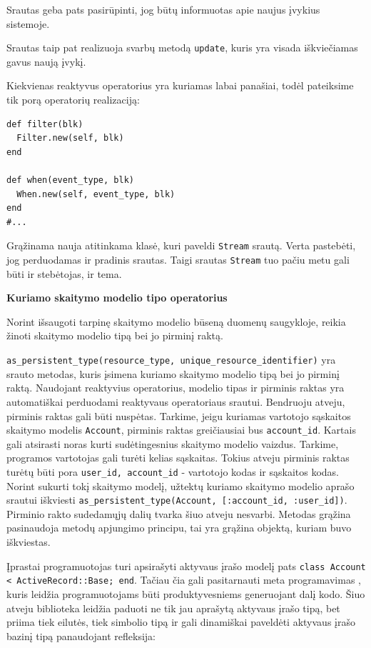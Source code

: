 Srautas geba pats pasirūpinti, jog būtų informuotas apie naujus įvykius sistemoje.

Srautas taip pat realizuoja svarbų metodą \lstinline|update|, kuris yra visada iškviečiamas gavus naują įvykį.

Kiekvienas reaktyvus operatorius yra kuriamas labai panašiai, todėl pateiksime tik porą operatorių realizaciją:

\begin{lstlisting}
def filter(blk)
  Filter.new(self, blk)
end

def when(event_type, blk)
  When.new(self, event_type, blk)
end
#...
\end{lstlisting}

Grąžinama nauja atitinkama klasė, kuri paveldi \lstinline|Stream| srautą. Verta pastebėti, jog perduodamas ir pradinis srautas. Taigi srautas \lstinline|Stream| tuo pačiu metu gali būti ir stebėtojas, ir tema.

\textbf{Kuriamo skaitymo modelio tipo operatorius}

Norint išsaugoti tarpinę skaitymo modelio būseną duomenų saugykloje, reikia žinoti skaitymo modelio tipą bei jo pirminį raktą.

\lstinline|as_persistent_type(resource_type, unique_resource_identifier)| yra srauto metodas, kuris įsimena kuriamo skaitymo modelio tipą bei jo pirminį raktą. Naudojant reaktyvius operatorius, modelio tipas ir pirminis raktas yra automatiškai perduodami reaktyvaus operatoriaus srautui. Bendruoju atveju, pirminis raktas gali būti nuspėtas. Tarkime, jeigu kuriamas vartotojo sąskaitos skaitymo modelis \lstinline|Account|, pirminis raktas greičiausiai bus \lstinline|account_id|. Kartais gali atsirasti noras kurti sudėtingesnius skaitymo modelio vaizdus. Tarkime, programos vartotojas gali turėti kelias sąskaitas. Tokius atveju pirminis raktas turėtų būti pora \lstinline|user_id, account_id| - vartotojo kodas ir sąskaitos kodas. Norint sukurti tokį skaitymo modelį, užtektų kuriamo skaitymo modelio aprašo srautui iškviesti \lstinline|as_persistent_type(Account, [:account_id, :user_id])|. Pirminio rakto sudedamųjų dalių tvarka šiuo atveju nesvarbi. Metodas grąžina pasinaudoja metodų apjungimo principu, tai yra grąžina objektą, kuriam buvo iškviestas.

Įprastai programuotojas turi apsirašyti aktyvaus įrašo modelį pats \lstinline|class Account < ActiveRecord::Base; end|. Tačiau čia gali pasitarnauti meta programavimas \cite{Olsen:2007:DPR:1349728}, kuris leidžia programuotojams būti produktyvesniems generuojant dalį kodo. Šiuo atveju biblioteka leidžia paduoti ne tik jau aprašytą aktyvaus įrašo tipą, bet priima tiek eilutės, tiek simbolio tipą ir gali dinamiškai paveldėti aktyvaus įrašo bazinį tipą panaudojant refleksija:

